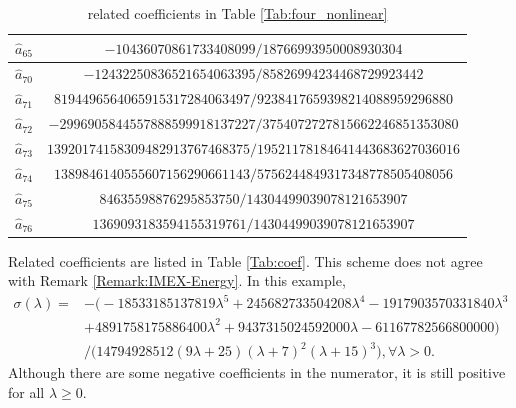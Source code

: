 \documentclass[a4paper, oneside]{book}
\def\hata{{\hat{a}}}
\begin{document}
\begin{itemize}
\begin{table}[h]
\begin{tabular}[h]{|c|c|}
$\hata_{65}$ &  $-10436070861733408099/18766993950008930304$ \\ \hline
$\hata_{70}$ &  $-12432250836521654063395/85826994234468729923442$ \\
$\hata_{71}$ &  $8194496564065915317284063497/9238417659398214088959296880$ \\
$\hata_{72}$ &  $-2996905844557888599918137227/3754072727815662246851353080$ \\
$\hata_{73}$ &  $13920174158309482913767468375/19521178184641443683627036016$ \\
$\hata_{74}$ &  $1389846140555607156290661143/5756244849317348778505408056$ \\ 
$\hata_{75}$ &  $84635598876295853750/14304499039078121653907$ \\ 
$\hata_{76}$ &  $1369093183594155319761/14304499039078121653907$ \\ \hline
\end{tabular}
    \caption{related coefficients in Table \ref{Tab:four_nonlinear}}
\end{table}

Related coefficients are listed in Table \ref{Tab:coef}. 
This scheme does not agree with Remark \ref{Remark:IMEX-Energy}. 
 In this example,
\begin{align*}
\sigma(\lambda) = &-\Big(- 18533185137819\lambda^5 + 245682733504208\lambda^4 - 1917903570331840\lambda^3 \\
&+ 4891758175886400\lambda^2 + 9437315024592000\lambda - 61167782566800000\Big)\\
&/\Big(14794928512(9\lambda + 25)(\lambda + 7)^2(\lambda + 15)^3\Big) , \forall \lambda > 0.
\end{align*}
Although there are some negative coefficients in the numerator, it is still positive for all $\lambda \geq 0$.
\end{itemize}
\end{document}
